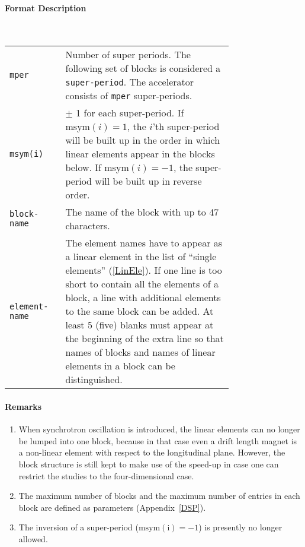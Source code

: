 \paragraph{Format Description}~

\bigskip
\begin{longtabu}{@{}lp{0.75\linewidth}}
    \texttt{mper} & Number of super periods. The following set of blocks is considered a \texttt{super-period}. The accelerator consists of \texttt{mper} super-periods. \\
    \texttt{msym(i)} & $\pm$ 1 for each super-period. If $\mathrm{msym}(i)=1$, the \mbox{$i$'th} super-period will be built up in the order in which linear elements appear in the blocks  below. If $\mathrm{msym}(i)=-1$, the super-period will be built up in reverse order. \\
    \texttt{block-name} & The name of the block with up to 47 characters. \\
    \texttt{element-name} & The element names have to appear as a linear element in the list of ``single elements'' (\ref{LinEle}). If one line is too short to contain all the elements of a block, a line with additional elements to the same block can be added. At least 5 (five) blanks must appear at the beginning of the extra line so that names of blocks and names of linear elements in a block can be distinguished.
\end{longtabu}

\paragraph{Remarks}
\begin{enumerate}
    \item When synchrotron oscillation is introduced, the linear elements can no longer be lumped into one block, because in that case even a drift length magnet is a non-linear element with respect to the longitudinal plane. However, the block structure is still kept to make use of the speed-up in case one can restrict the studies to the four-dimensional case.
    \item The maximum number of blocks and the maximum number of entries in each block are defined as parameters (Appendix~\ref{DSP}).
    \item The inversion of a super-period ($\mathrm{msym(i)} = -1$) is presently no longer allowed.
\end{enumerate}

